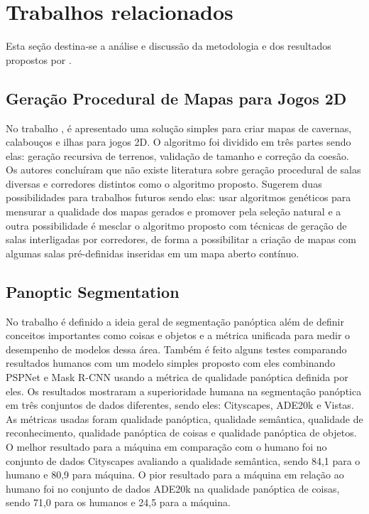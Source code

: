 \section{Trabalhos relacionados}

Esta seção destina-se a análise e discussão da metodologia e dos resultados propostos por .

\subsection*{Geração Procedural de Mapas para Jogos 2D}

No trabalho , é apresentado uma solução simples para criar mapas de cavernas, calabouços e ilhas para jogos 2D. O algoritmo foi dividido em três partes sendo elas: geração recursiva de terrenos, validação de tamanho e correção da coesão. Os autores concluíram que não existe literatura sobre geração procedural de salas diversas e corredores distintos como o algoritmo proposto. Sugerem duas possibilidades para trabalhos futuros sendo elas: usar algoritmos genéticos para mensurar a qualidade dos mapas gerados e promover pela seleção natural e a outra possibilidade é mesclar o algoritmo proposto com técnicas de geração de salas interligadas por corredores, de forma a possibilitar a criação de mapas com algumas salas pré-definidas inseridas em um mapa aberto contínuo.

\subsection*{Panoptic Segmentation}

No trabalho  é definido a ideia geral de segmentação panóptica além de definir conceitos importantes como coisas e objetos e a métrica unificada para medir o desempenho de modelos dessa área. Também é feito alguns testes comparando resultados humanos com um modelo simples proposto com eles combinando PSPNet e Mask R-CNN usando a métrica de qualidade panóptica definida por eles. Os resultados mostraram a superioridade humana na segmentação panóptica em três conjuntos de dados diferentes, sendo eles: Cityscapes, ADE20k e Vistas. As métricas usadas foram qualidade panóptica, qualidade semântica, qualidade de reconhecimento, qualidade panóptica
 de coisas e qualidade panóptica de objetos. O melhor resultado para a máquina em comparação com o humano foi no conjunto de dados Cityscapes avaliando a qualidade semântica, sendo 84,1 para o humano e 80,9 para máquina. O pior resultado para a máquina em relação ao humano foi no conjunto de dados ADE20k na qualidade panóptica de coisas, sendo 71,0 para os humanos e 24,5 para a máquina.

